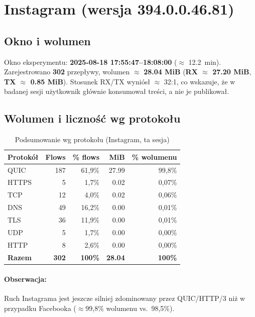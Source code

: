 \section{Instagram (wersja 394.0.0.46.81)}
\label{sec:instagram}

\subsection*{Okno i wolumen}
Okno eksperymentu: \textbf{2025-08-18 17{:}55{:}47–18{:}08{:}00} ($\approx$ \SI{12.2}{\minute}). 
Zarejestrowano \textbf{302} przepływy, wolumen $\approx$ \textbf{28.04 MiB} 
(\textbf{RX $\approx$ 27.20 MiB}, \textbf{TX $\approx$ 0.85 MiB}).  
Stosunek RX/TX wyniósł $\approx$ 32:1, co wskazuje, że w badanej sesji użytkownik głównie konsumował treści, a nie je publikował.

\subsection{Wolumen i liczność wg protokołu}
\begin{table}[H]
  \centering
  \caption{Podsumowanie wg protokołu (Instagram, ta sesja)}
  \label{tab:ig-proto}
  \begin{tabular}{lrrrr}
    \toprule
    \textbf{Protokół} & \textbf{Flows} & \textbf{\% flows} & \textbf{MiB} & \textbf{\% wolumenu} \\
    \midrule
    QUIC  & 187 & 61{,}9\% & 27.99 & 99{,}8\% \\
    HTTPS & 5   & 1{,}7\%  & 0.02  & 0{,}07\% \\
    TCP   & 12  & 4{,}0\%  & 0.02  & 0{,}06\% \\
    DNS   & 49  & 16{,}2\% & 0.00  & 0{,}01\% \\
    TLS   & 36  & 11{,}9\% & 0.00  & 0{,}01\% \\
    UDP   & 5   & 1{,}7\%  & 0.00  & 0{,}00\% \\
    HTTP  & 8   & 2{,}6\%  & 0.00  & 0{,}00\% \\
    \midrule
    \textbf{Razem} & \textbf{302} & \textbf{100\%} & \textbf{28.04} & \textbf{100\%} \\
    \bottomrule
  \end{tabular}
\end{table}

\paragraph{Obserwacja:} 
Ruch Instagrama jest jeszcze silniej zdominowany przez QUIC/HTTP/3 niż w przypadku Facebooka ($\approx$99,8\% wolumenu vs.\ 98,5\%). 


